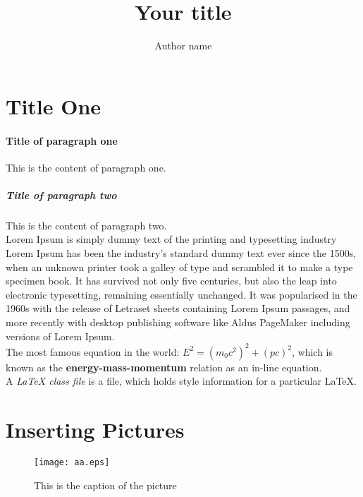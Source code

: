 \documentclass[12pt,a4paper]{article} 								%
\author{Author name} 												%
\title{Your title}												    %
\begin{document}
\maketitle 															%


\section{Title One} 												%
\paragraph{Title of paragraph one}This is the content of paragraph one.
\subparagraph{Title of paragraph two} This is the content of paragraph two. \\

Lorem Ipsum is simply dummy text of the printing and typesetting industry Lorem Ipsum has been the industry's standard dummy text ever since the 1500s, when an unknown printer took a galley of type and scrambled it to make a type specimen book. It has survived not only five centuries, but also the leap into electronic typesetting, remaining essentially unchanged. It was popularised in the 1960s with the release of Letraset sheets containing Lorem Ipsum passages, and more recently with desktop publishing software like Aldus PageMaker including versions of Lorem Ipsum.\\

The most famous equation in the world: $E^2 = (m_0c^2)^2 + (pc)^2$, which is 
known as the \textbf{energy-mass-momentum} relation as an in-line equation.\\

A {\em \LaTeX{} class file} is a file, which holds style information for a particular \LaTeX{}.

\section{Inserting Pictures}									   %
\begin{figure}[htpb]
\centering
\texttt{[image: aa.eps]}


\caption{This is the caption of the picture}	   %
\label{fig:aa}
\end{figure}
\end{document}
